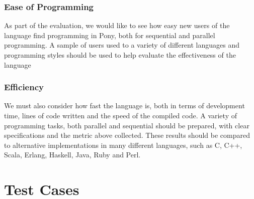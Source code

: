 \documentclass[11pt,a4paper]{report}
\begin{document}
\subsection{Ease of Programming}

As part of the evaluation, we would like to see how easy new users of the language find programming in Pony, both for sequential and parallel programming.
A sample of users used to a variety of different languages and programming styles should be used to help evaluate the effectiveness of the language

\subsection{Efficiency}

We must also consider how fast the language is, both in terms of development time, lines of code written and the speed of the compiled code.
A variety of programming tasks, both parallel and sequential should be prepared, with clear specifications and the metric above collected.
These results should be compared to alternative implementations in many different languages, such as C, C++, Scala, Erlang, Haskell, Java, Ruby and Perl.




\appendix
\chapter{Test Cases}
\label{app:test}
\end{document}
